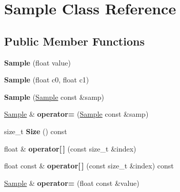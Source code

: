 \hypertarget{class_sample}{\section{Sample Class Reference}
\label{class_sample}
}
\subsection*{Public Member Functions}
\begin{DoxyCompactItemize}
\item 
\hypertarget{class_sample_a987ac63fe78678e24b12571e8ae41828}{{\bfseries Sample} (float value)}\label{class_sample_a987ac63fe78678e24b12571e8ae41828}

\item 
\hypertarget{class_sample_a9b3eacfed2d9001d27cb8e8dfa6bc5ae}{{\bfseries Sample} (float c0, float c1)}\label{class_sample_a9b3eacfed2d9001d27cb8e8dfa6bc5ae}

\item 
\hypertarget{class_sample_aa77082a2ad5a8901b5f7927280b29ee3}{{\bfseries Sample} (\hyperlink{class_sample}{Sample} const \&samp)}\label{class_sample_aa77082a2ad5a8901b5f7927280b29ee3}

\item 
\hypertarget{class_sample_ad19e341b74e5a2c020f9f8745dcee80a}{\hyperlink{class_sample}{Sample} \& {\bfseries operator=} (\hyperlink{class_sample}{Sample} const \&samp)}\label{class_sample_ad19e341b74e5a2c020f9f8745dcee80a}

\item 
\hypertarget{class_sample_a1d8fffd30873e259f227ac7fc501fcc1}{size\+\_\+t {\bfseries Size} () const }\label{class_sample_a1d8fffd30873e259f227ac7fc501fcc1}

\item 
\hypertarget{class_sample_aaef59bb9515e6b516f818ca4f005ac95}{float \& {\bfseries operator\mbox{[}$\,$\mbox{]}} (const size\+\_\+t \&index)}\label{class_sample_aaef59bb9515e6b516f818ca4f005ac95}

\item 
\hypertarget{class_sample_a180bf80d6962a1762a5440f5d43c0c29}{float const \& {\bfseries operator\mbox{[}$\,$\mbox{]}} (const size\+\_\+t \&index) const }\label{class_sample_a180bf80d6962a1762a5440f5d43c0c29}

\item 
\hypertarget{class_sample_a98f88c0ffa8de957b0c13aa44270a26f}{\hyperlink{class_sample}{Sample} \& {\bfseries operator=} (float const \&value)}\label{class_sample_a98f88c0ffa8de957b0c13aa44270a26f}


\end{DoxyCompactItemize}
